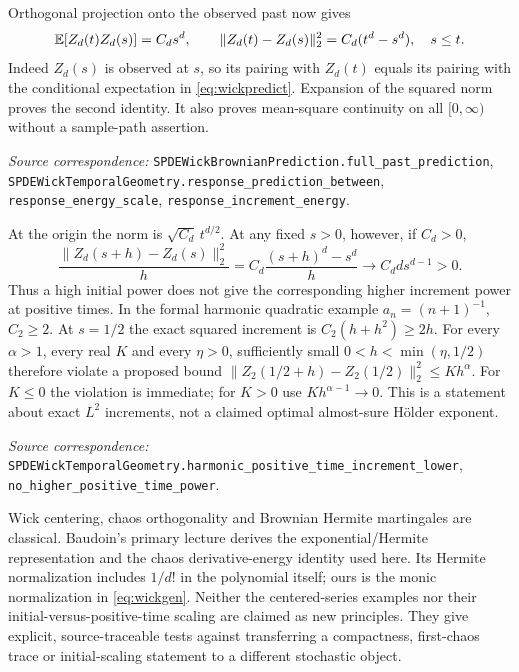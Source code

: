 \documentclass[11pt]{article}
\newcommand{\code}[1]{{\small\nolinkurl{#1}}}
\begin{document}
Orthogonal projection onto the observed past now gives
\begin{equation}\label{eq:wickincrement}
 \mathbb E[Z_d(t)Z_d(s)]=C_ds^d,\qquad
 \|Z_d(t)-Z_d(s)\|_2^2=C_d(t^d-s^d),\quad s\leq t.
\end{equation}
Indeed $Z_d(s)$ is observed at $s$, so its pairing with $Z_d(t)$
equals its pairing with the conditional expectation in
\eqref{eq:wickpredict}. Expansion of the squared norm proves the
second identity. It also proves mean-square continuity on all
$[0,\infty)$ without a sample-path assertion.
\par\smallskip\begingroup\small\raggedright
\noindent\textit{Source correspondence:}
\code{SPDEWickBrownianPrediction.full_past_prediction},
\code{SPDEWickTemporalGeometry.response_prediction_between},
\code{response_energy_scale}, \code{response_increment_energy}.\par\endgroup

At the origin the norm is $\sqrt{C_d}\,t^{d/2}$. At any fixed $s>0$,
however, if $C_d>0$,
\[
 \frac{\|Z_d(s+h)-Z_d(s)\|_2^2}{h}
   =C_d\frac{(s+h)^d-s^d}{h}
       \longrightarrow C_d d s^{d-1}>0.
\]
Thus a high initial power does not give the corresponding higher
increment power at positive times. In the formal harmonic quadratic
example $a_n=(n+1)^{-1}$, $C_2\geq2$. At $s=1/2$ the exact squared
increment is $C_2(h+h^2)\geq2h$. For every $\alpha>1$, every real
$K$ and every $\eta>0$, sufficiently small $0<h<\min(\eta,1/2)$
therefore violate a proposed bound
$\|Z_2(1/2+h)-Z_2(1/2)\|_2^2\leq Kh^\alpha$.
For $K\leq0$ the violation is immediate; for $K>0$ use
$Kh^{\alpha-1}\to0$. This is a statement about exact $L^2$
increments, not a claimed optimal almost-sure H\"older exponent.
\par\smallskip\begingroup\small\raggedright
\noindent\textit{Source correspondence:}
\code{SPDEWickTemporalGeometry.harmonic_positive_time_increment_lower},
\code{no_higher_positive_time_power}.\par\endgroup

Wick centering, chaos orthogonality and Brownian Hermite martingales
are classical. Baudoin's primary lecture \cite{Baudoin} derives the
exponential/Hermite representation and the chaos derivative-energy
identity used here. Its Hermite normalization includes $1/d!$ in
the polynomial itself; ours is the monic normalization in
\eqref{eq:wickgen}. Neither the centered-series examples nor their
initial-versus-positive-time scaling are claimed as new principles.
They give explicit, source-traceable tests against transferring a
compactness, first-chaos trace or initial-scaling statement to a
different stochastic object.
\end{document}
